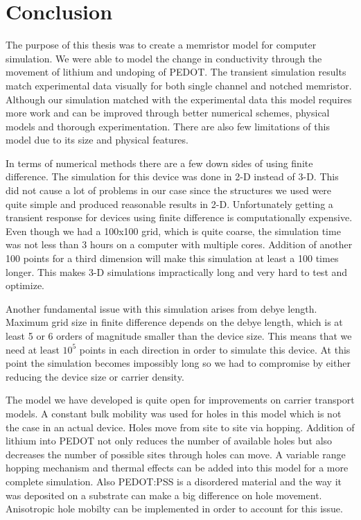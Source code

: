 
\chapter{Conclusion} %

\label{Chapter7} %



The purpose of this thesis was to create a memristor model for computer simulation. We were able to model the change in conductivity through the movement of lithium and undoping of PEDOT. The transient simulation results match experimental data visually for both single channel and notched memristor. Although our simulation matched with the experimental data this model requires more work and can be improved through better numerical schemes, physical models and thorough experimentation. There are also few limitations of this model due to its size and physical features.

In terms of numerical methods there are a few down sides of using finite difference. The simulation for this device was done in 2-D instead of 3-D. This did not cause a lot of problems in our case since the structures we used were quite simple and produced reasonable results in 2-D. Unfortunately getting a transient response for devices using finite difference is computationally expensive. Even though we had a 100x100 grid, which is quite coarse, the simulation time was not less than 3 hours on a computer with multiple cores. Addition of another 100 points for a third dimension will make this simulation at least a 100 times longer. This makes 3-D simulations impractically long and very hard to test and optimize.

Another fundamental issue with this simulation arises from debye length. Maximum grid size in finite difference depends on the debye length, which is at least 5 or 6 orders of magnitude smaller than the device size. This means that we need at least $10^5$ points in each direction in order to simulate this device. At this point the simulation becomes impossibly long so we had to compromise by either reducing the device size or carrier density.     

The model we have developed is quite open for improvements on carrier transport models. A constant bulk mobility was used for holes in this model which is not the case in an actual device. Holes move from site to site via hopping. Addition of lithium into PEDOT not only reduces the number of available holes but also decreases the number of possible sites through holes can move. A variable range hopping mechanism and thermal effects can be added into this model for a more complete simulation. Also PEDOT:PSS is a disordered material and the way it was deposited on a substrate can make a big difference on hole movement. Anisotropic hole mobilty can be implemented in order to account for this issue.

